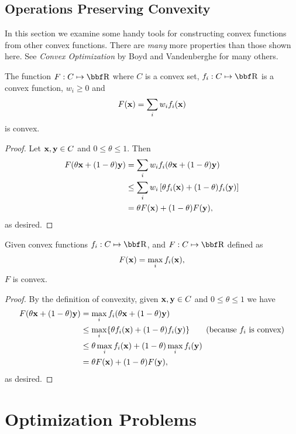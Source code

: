 \documentclass{article}
\begin{document}
\subsection{Operations Preserving Convexity}

In this section we examine some handy tools for constructing
convex functions from other convex functions. There are \textit{many}
more properties than those shown here. See \textit{Convex Optimization}
by Boyd and Vandenberghe for many others.

\begin{theorem}
    The function $F : C \mapsto \RR$ where $C$ is a convex set, $f_i : C\mapsto\RR$ is a convex
    function, $w_i \geq 0$ and
    \[
        F({\bf x}) = \sum_i w_i f_i({\bf x})
    \]
    is convex.
\end{theorem}
\begin{proof}
    Let ${\bf x},{\bf y}\in C$ and $0\leq\theta\leq1$. Then
    \begin{align*}
        F(\theta{\bf x} + (1-\theta){\bf y}) &= \sum_i w_if_i(\theta{\bf x} + (1-\theta){\bf y})\\
        &\leq \sum_i w_i\left[ \theta f_i({\bf x}) + (1-\theta)f_i({\bf y}) \right]\\
        &= \theta F({\bf x}) + (1-\theta)F({\bf y}),
    \end{align*}
    as desired.
\end{proof}

\begin{theorem}
    Given convex functions $f_i : C \mapsto \RR$, and $F : C \mapsto \RR$ defined
    as
    \[
        F({\bf x}) = \max_i f_i({\bf x}),
    \]
    $F$ is convex.
\end{theorem}
\begin{proof}
    By the definition of convexity, given ${\bf x},{\bf y}\in C$ and $0\leq\theta\leq1$ we
    have
    \begin{align*}
        F(\theta{\bf x} + (1-\theta){\bf y}) &= \max_i f_i(\theta{\bf x} + (1-\theta){\bf y})\\
        &\leq \max_i\{\theta f_i({\bf x}) + (1-\theta)f_i({\bf y})\} \tag{because $f_i$ is convex}\\
        &\leq \theta \max_i f_i({\bf x}) + (1-\theta)\max_i f_i({\bf y})\\
        &= \theta F({\bf x}) + (1-\theta) F({\bf y}),
    \end{align*}
    as desired.
\end{proof}

\section{Optimization Problems}
\end{document}
